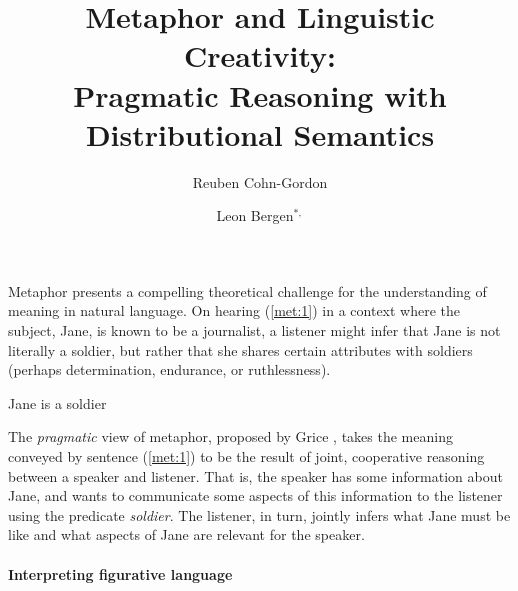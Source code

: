 \documentclass[9pt,twocolumn,twoside,lineno]{pnas-new}
\title{Metaphor and Linguistic Creativity:\\ Pragmatic Reasoning with Distributional Semantics}
\author[a]{Reuben Cohn-Gordon}
\author[b]{Leon Bergen$^{*,}$}
\affil[a]{Stanford University}
\affil[b]{University of California San Diego}
\begin{document}
\maketitle
\thispagestyle{firststyle}


Metaphor presents a compelling theoretical challenge for the understanding of meaning in natural language. On hearing (\ref{met:1}) in a context where the subject, Jane, is known to be a journalist, a listener might infer that Jane is not literally a soldier, but rather that she shares certain attributes with soldiers (perhaps determination, endurance, or ruthlessness). 
	\begin{examples}
	\item Jane is a soldier \label{met:1}
	\end{examples}

The \emph{pragmatic} view of metaphor, proposed by Grice \cite{grice}, takes the meaning conveyed by sentence (\ref{met:1}) to be the result of joint, cooperative reasoning between a speaker and listener. That is, the speaker has some information about Jane, and wants to communicate some aspects of this information to the listener using the predicate \emph{soldier}. The listener, in turn, jointly infers what Jane must be like and what aspects of Jane are relevant for the speaker. 




\paragraph{Interpreting figurative language}
\end{document}
